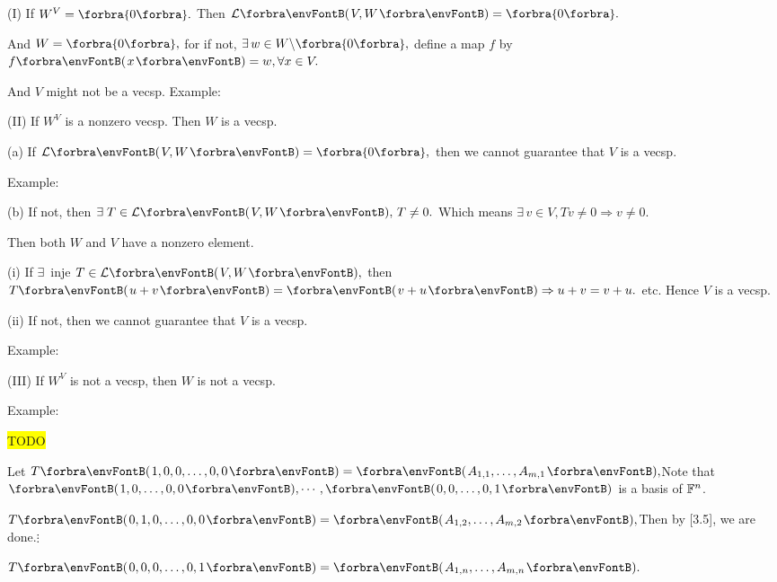 \documentclass[a4paper, 11pt, UTF8]{article}
\begin{document}
\begin{large}
\SepLine

\par\quad
(I) If $W^V=\zeroSubs.$ Then $\Lm{V,W}=\zeroSubs.$\par\quad\HI
And $W=\zeroSubs,$ for if not, $\exists\,w\in W\backslash\zeroSubs,$ define a map $f$ by $f\Par{x}=w,\forall x\in V.$\par\quad\HI
And $V$ might not be a vecsp. Example: \par\quad\EndI
(II) If $W^V$ is a nonzero vecsp. Then $W$ is a vecsp.\par\quad\HII
(a) If $\Lm{V,W}=\zeroSubs,$ then we cannot guarantee that $V$ is a vecsp.\par\quad\HII\Ha
Example: \par\quad\HII
(b) If not, then $\exists\;T\in\Lm{V,W},\,T\neq 0.$ Which means $\exists\,v\in V,Tv\neq 0\Rightarrow v\neq 0.$\par\quad\HII\Hb
Then both $W$ and $V$ have a nonzero element.\par\quad\HII\Hb
(i) If $\exists\,$ inje $T\in\Lm{V,W},$ then $T\Par{u+v}=\Par{v+u}\Rightarrow u+v=v+u.$ etc. Hence $V$ is a vecsp.\par\quad\HII\Ha\Endi
(ii) If not, then we cannot guarantee that $V$ is a vecsp.\par\quad\HII\Hb\Hii
Example: \par\quad\EndII
(III) If $W^V$ is not a vecsp, then $W$ is not a vecsp. \par\quad\HIII
Example: \par\quad
\colorbox{yellow}{TODO}\PfEnd
\SepLine\pagebreak

\par\quad
Let $T\Par{1,0,0,\dots,0,0}=\Par{A_{1,1},\dots,A_{m,1}},$\quad Note that $\Par{1,0,\dots,0,0},\cdots,\Par{0,0,\dots,0,1}$ is a basis of ${\mathbb{F}}^n$.\par\quad
{}$T\Par{0,1,0,\dots,0,0}=\Par{A_{1,2},\dots,A_{m,2}},$\quad Then by [3.5], we are done.\PfEnd{}$\vdots$\par\quad
{}$T\Par{0,0,0,\dots,0,1}=\Par{A_{1,n},\dots,A_{m,n}}.$\par
\SepLine


\end{large}
\end{document}
